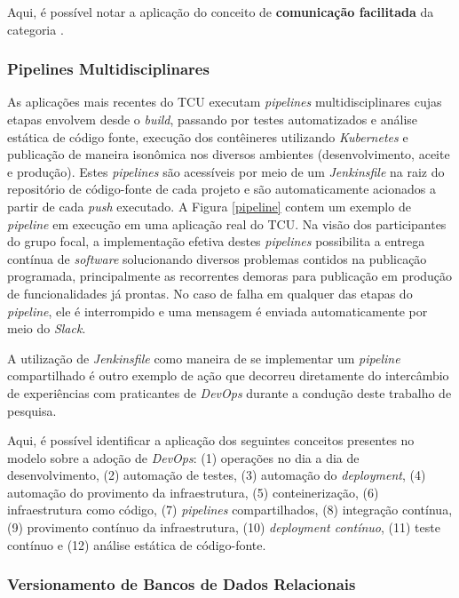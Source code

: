 Aqui, é possível notar a aplicação do conceito de {\bf comunicação facilitada}
da categoria .

\subsubsection{Pipelines Multidisciplinares}

As aplicações mais recentes do \acrshort{TCU} executam {\it pipelines}
multidisciplinares cujas etapas envolvem desde o {\it build}, passando por testes
automatizados e análise estática de código fonte, execução dos contêineres
utilizando {\it Kubernetes} e publicação de maneira isonômica nos diversos
ambientes (desenvolvimento, aceite e produção). Estes {\it pipelines} são
acessíveis por meio de um {\it Jenkinsfile} na raiz do repositório de código-fonte
de cada projeto e são automaticamente acionados a partir de cada {\it push}
executado. A Figura \ref{pipeline} contem um exemplo de {\it pipeline} em execução em uma
aplicação real do \acrshort{TCU}. Na visão dos participantes do grupo focal,
a implementação efetiva destes {\it pipelines} possibilita a entrega contínua
de {\it software} solucionando diversos problemas contidos na publicação
programada, principalmente as recorrentes demoras para publicação em produção
de funcionalidades já prontas. No caso de falha em qualquer das etapas do
{\it pipeline}, ele é interrompido e uma mensagem é enviada automaticamente
por meio do {\it Slack}.


A utilização de {\it Jenkinsfile} como maneira de se implementar um {\it pipeline}
compartilhado é outro exemplo de ação  que decorreu diretamente do intercâmbio
de experiências com praticantes de {\it DevOps} durante a condução deste
trabalho de pesquisa.

Aqui, é possível identificar a aplicação dos seguintes conceitos presentes no
modelo sobre a adoção de {\it DevOps}: (1) operações no dia a dia de
desenvolvimento, (2) automação de testes, (3) automação do {\it deployment},
(4) automação do provimento da infraestrutura, (5) conteinerização,
(6) infraestrutura como código, (7) {\it pipelines} compartilhados, (8) integração
contínua, (9) provimento contínuo da infraestrutura, (10) {\it deployment contínuo},
(11) teste contínuo e (12) análise estática de código-fonte.

\subsubsection{Versionamento de Bancos de Dados Relacionais}

